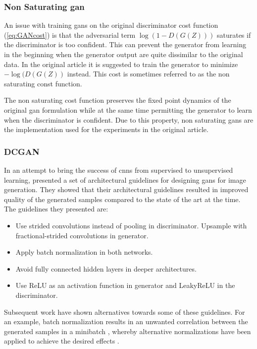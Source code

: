 \subsubsection{Non Saturating \acrshort{gan}} 
An issue with training \acrshort{gans} on the original discriminator cost function (\ref{eq:GANcost}) is that the adversarial term $\log(1-D(G(Z)))$ saturates if the discriminator is too confident. This can prevent the generator from learning in the beginning when the generator output are quite dissimilar to the original data. In the original article it is suggested to train the generator to minimize $-\log(D(G(Z))$ instead. This cost is sometimes referred to as the non saturating const function.

The non saturating cost function preserves the fixed point dynamics of the original \acrshort{gan} formulation while at the same time permitting the generator to learn when the discriminator is confident. Due to this property, non saturating \acrshort{gans} are the implementation used for the experiments in the original article.

\subsubsection{DCGAN}
In an attempt to bring the success of \acrfull{cnns} from supervised to unsupervised learning, \textcite{radfordMC152015} presented a set of architectural guidelines for designing \acrshort{gans} for image generation. They showed that their architectural guidelines resulted in improved quality of the generated samples compared to the state of the art at the time. The guidelines they presented are:

\begin{itemize}
    \item Use strided convolutions instead of pooling in discriminator. Upsample with fractional-strided convolutions in generator.
    \item Apply batch normalization \parencite{ioffeS15batchnorm} in both networks.
    \item Avoid fully connected hidden layers in deeper architectures.
    \item Use ReLU as an activation function in generator and LeakyReLU in the discriminator.
\end{itemize}

Subsequent work have shown alternatives towards some of these guidelines. For an example, batch normalization results in an unwanted correlation between the generated samples in a minibatch \parencite{xiang2017effects}, whereby alternative normalizations have been applied to achieve the desired effects \parencite{karras2017progressive, miyato2017spectral}.

